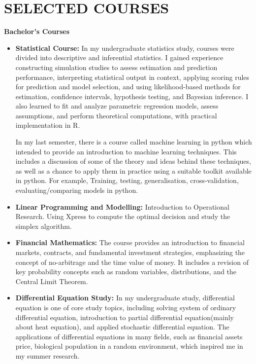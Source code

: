 \documentclass[a4paper,9pt]{extarticle}
\begin{document}
\section*{SELECTED COURSES}
\noindent
\textbf{Bachelor's Courses}
\begin{itemize}
\item \textbf{Statistical Course:} In my undergraduate statistics study, courses were divided into descriptive and inferential statistics. I gained experience constructing simulation studies to assess estimation and prediction performance, interpreting statistical output in context, applying scoring rules for prediction and model selection, and using likelihood-based methods for estimation, confidence intervals, hypothesis testing, and Bayesian inference. I also learned to fit and analyze parametric regression models, assess assumptions, and perform theoretical computations, with practical implementation in R.

In my last semester, there is a course called machine learning in python which intended to provide an introduction to machine learning techniques. This includes a discussion of some of the theory and ideas behind these techniques, as well as a chance to apply them in practice using a suitable toolkit available in python. For example, Training, testing, generalisation, cross-validation, evaluating/comparing models in python.

\item \textbf{Linear Programming and Modelling:} Introduction to Operational Research. Using Xpress to compute the optimal decision and study the simplex algorithm.

\item \textbf{Financial Mathematics:} The course provides an introduction to financial markets, contracts, and fundamental investment strategies, emphasizing the concept of no-arbitrage and the time value of money. It includes a revision of key probability concepts such as random variables, distributions, and the Central Limit Theorem.

\item \textbf{Differential Equation Study:} In my undergraduate study, differential equation is one of core study topics, including solving system of ordinary differential equation, introduction to partial differential equation(mainly about heat equation), and applied stochastic differential equation. The applications of differential equations in many fields, such as financial assets price, biological population in a random environment, which inspired me in my summer research.

\end{itemize}
\end{document}
